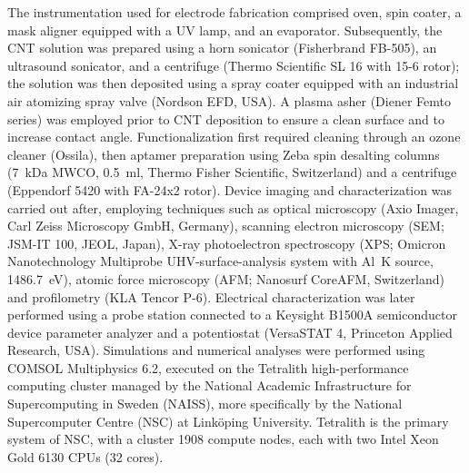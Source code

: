 The instrumentation used for electrode fabrication comprised oven, spin coater, a mask aligner equipped with a UV lamp, and an evaporator. 
Subsequently, the CNT solution was prepared using a horn sonicator (Fisherbrand FB-505), an ultrasound sonicator, and a centrifuge (Thermo Scientific SL 16 with 15-6 rotor); the solution was then deposited using a spray coater equipped with an industrial air atomizing spray valve (Nordson EFD, USA). A plasma asher (Diener Femto series) was employed prior to CNT deposition to ensure a clean surface and to increase contact angle.
Functionalization first required cleaning through an ozone cleaner (Ossila), then aptamer preparation using Zeba spin desalting columns (\SI{7}{\kilo\dalton} MWCO, \SI{0.5}{\ml}, Thermo Fisher Scientific, Switzerland) and a centrifuge (Eppendorf 5420 with FA-24x2 rotor).
Device imaging and characterization was carried out after, employing techniques such as optical microscopy (Axio Imager, Carl Zeiss Microscopy GmbH, Germany), scanning electron microscopy (SEM; JSM-IT 100, JEOL, Japan), X-ray photoelectron spectroscopy (XPS; Omicron Nanotechnology Multiprobe UHV-surface-analysis system with Al~K\textalpha{} source, \SI{1486.7}{\electronvolt}), atomic force microscopy (AFM; Nanosurf CoreAFM, Switzerland) and profilometry (KLA Tencor P-6). Electrical characterization was later performed using a probe station connected to a Keysight B1500A semiconductor device parameter analyzer and a potentiostat (VersaSTAT 4, Princeton Applied Research, USA).
%
Simulations and numerical analyses were performed using COMSOL Multiphysics 6.2, executed on the Tetralith high-performance computing cluster managed by the National Academic Infrastructure for Supercomputing in Sweden (NAISS), more specifically by the National Supercomputer Centre (NSC)
at Linköping University. Tetralith is the primary system of NSC, with a cluster \num{1908} compute nodes, each with two Intel Xeon Gold 6130 CPUs (32 cores).

